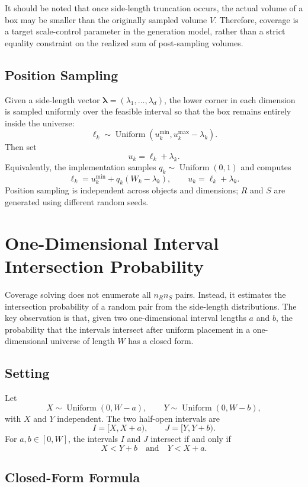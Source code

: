 \documentclass[11pt,a4paper]{article}
\newcommand{\Uniform}{\operatorname{Uniform}}
\begin{document}
It should be noted that once side-length truncation occurs, the actual volume of a box may be smaller than the originally sampled volume $V$. Therefore, coverage is a target scale-control parameter in the generation model, rather than a strict equality constraint on the realized sum of post-sampling volumes.

\subsection{Position Sampling}

Given a side-length vector $\boldsymbol\lambda=(\lambda_1,\dots,\lambda_d)$, the lower corner in each dimension is sampled uniformly over the feasible interval so that the box remains entirely inside the universe:
\[
  \ell_k\sim\Uniform(u_k^{\min},u_k^{\max}-\lambda_k).
\]
Then set
\[
  u_k=\ell_k+\lambda_k.
\]
Equivalently, the implementation samples $q_k\sim\Uniform(0,1)$ and computes
\[
  \ell_k=u_k^{\min}+q_k(W_k-\lambda_k),
  \qquad
  u_k=\ell_k+\lambda_k.
\]
Position sampling is independent across objects and dimensions; $R$ and $S$ are generated using different random seeds.

\section{One-Dimensional Interval Intersection Probability}

Coverage solving does not enumerate all $n_Rn_S$ pairs. Instead, it estimates the intersection probability of a random pair from the side-length distributions. The key observation is that, given two one-dimensional interval lengths $a$ and $b$, the probability that the intervals intersect after uniform placement in a one-dimensional universe of length $W$ has a closed form.

\subsection{Setting}

Let
\[
  X\sim\Uniform(0,W-a),
  \qquad
  Y\sim\Uniform(0,W-b),
\]
with $X$ and $Y$ independent. The two half-open intervals are
\[
  I=[X,X+a),
  \qquad
  J=[Y,Y+b).
\]
For $a,b\in[0,W]$, the intervals $I$ and $J$ intersect if and only if
\[
  X<Y+b
  \quad\text{and}\quad
  Y<X+a.
\]

\subsection{Closed-Form Formula}
\end{document}

